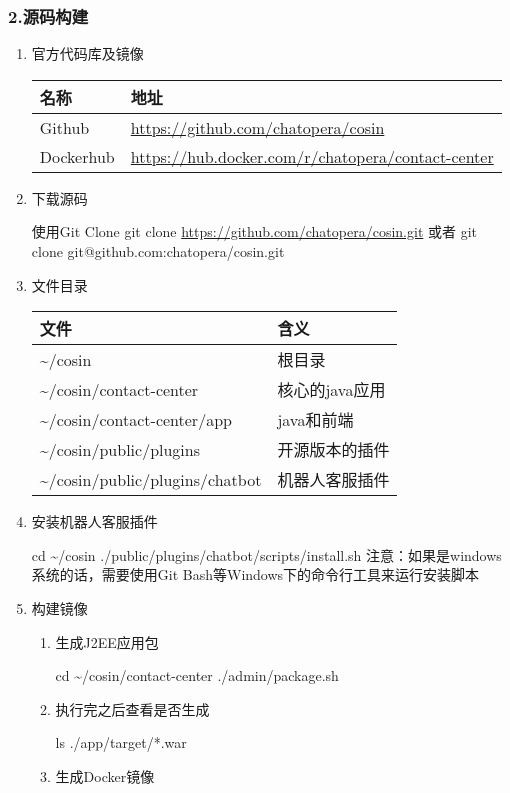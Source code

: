 \documentclass{article}
\begin{document}
\hypertarget{ux6e90ux7801ux6784ux5efa}{%
\subsubsection{2.源码构建}\label{ux6e90ux7801ux6784ux5efa}}

\begin{enumerate}
\item
  官方代码库及镜像

  \begin{longtable}[]{@{}ll@{}}
  \toprule
  名称 & 地址\tabularnewline
  \midrule
  \endhead
  Github & \url{https://github.com/chatopera/cosin}\tabularnewline
  Dockerhub &
  \url{https://hub.docker.com/r/chatopera/contact-center}\tabularnewline
  \bottomrule
  \end{longtable}
\item
  下载源码

  使用Git Clone git clone \url{https://github.com/chatopera/cosin.git}
  或者 git clone git@github.com:chatopera/cosin.git
\item
  文件目录

  \begin{longtable}[]{@{}ll@{}}
  \toprule
  文件 & 含义\tabularnewline
  \midrule
  \endhead
  \textasciitilde{}/cosin & 根目录\tabularnewline
  \textasciitilde{}/cosin/contact-center & 核心的java应用\tabularnewline
  \textasciitilde{}/cosin/contact-center/app & java和前端\tabularnewline
  \textasciitilde{}/cosin/public/plugins & 开源版本的插件\tabularnewline
  \textasciitilde{}/cosin/public/plugins/chatbot &
  机器人客服插件\tabularnewline
  \bottomrule
  \end{longtable}
\item
  安装机器人客服插件

  cd \textasciitilde{}/cosin ./public/plugins/chatbot/scripts/install.sh
  注意：如果是windows系统的话，需要使用Git
  Bash等Windows下的命令行工具来运行安装脚本
\item
  构建镜像

  \begin{enumerate}
  \item
    生成J2EE应用包

    cd \textasciitilde{}/cosin/contact-center ./admin/package.sh
  \item
    执行完之后查看是否生成

    ls ./app/target/*.war
  \item
    生成Docker镜像


\end{enumerate}
\end{enumerate}
\end{document}
